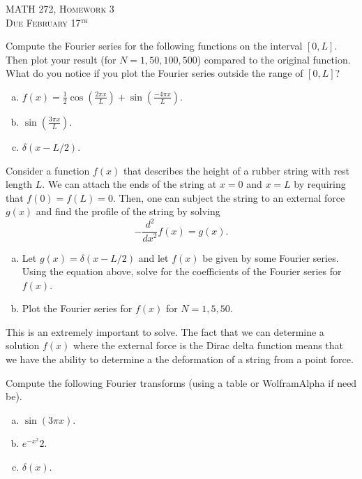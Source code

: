 \documentclass[12pt]{article} %
\begin{document}
\begin{center}
   \textsc{\large MATH 272, Homework 3}\\
   \textsc{Due February 17$^\textrm{th}$}
\end{center}
\vspace{.5cm}


\begin{problem}
Compute the Fourier series for the following functions on the interval $[0,L]$. Then plot your result (for $N=1,50,100,500$) compared to the original function. What do you notice if you plot the Fourier series outside the range of $[0,L]$?
\begin{enumerate}[(a)]
	\item $f(x)=\frac{1}{2}\cos\left(\frac{2\pi x}{L}\right)+\sin\left(\frac{-4\pi x}{L}\right)$.
	\item $\sin\left(\frac{3\pi x}{L}\right)$.
	\item $\delta(x-L/2)$.
\end{enumerate}
\end{problem}

\begin{problem}
Consider a function $f(x)$ that describes the height of a rubber string with rest length $L$. We can attach the ends of the string at $x=0$ and $x=L$ by requiring that $f(0)=f(L)=0$.  Then, one can subject the string to an external force $g(x)$ and find the profile of the string by solving
\[
-\frac{d^2}{dx^2} f(x) = g(x).
\]
\begin{enumerate}[(a)]
	\item Let $g(x)=\delta(x-L/2)$ and let $f(x)$ be given by some Fourier series.  Using the equation above, solve for the coefficients of the Fourier series for $f(x)$.
	\item Plot the Fourier series for $f(x)$ for $N=1,5,50$.
\end{enumerate}
This is an extremely important to solve. The fact that we can determine a solution $f(x)$ where the external force is the Dirac delta function means that we have the ability to determine a the deformation of a string from a point force.
\end{problem}


\begin{problem}
Compute the following Fourier transforms (using a table or WolframAlpha if need be).  
\begin{enumerate}[(a)]
	\item $\sin(3\pi x)$.
	\item $e^{-x^2}{2}$.
	\item $\delta(x)$.
\end{enumerate}
\end{problem}
\end{document}
